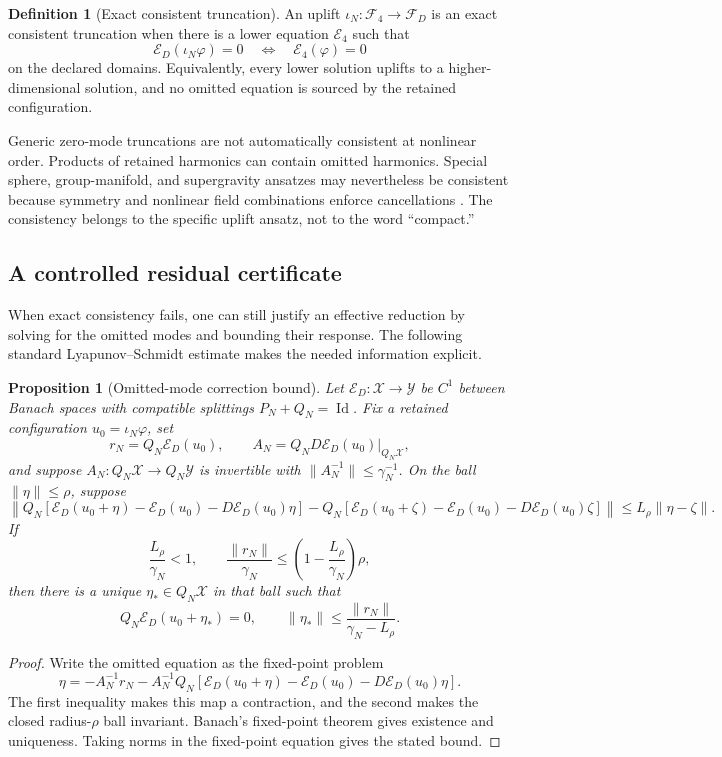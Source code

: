 \documentclass[11pt]{article}
\newtheorem{proposition}[theorem]{Proposition}
\theoremstyle{definition}
\newtheorem{definition}[theorem]{Definition}
\theoremstyle{remark}
\newcommand{\cE}{\mathcal E}
\newcommand{\cF}{\mathcal F}
\newcommand{\cX}{\mathcal X}
\newcommand{\cY}{\mathcal Y}
\newcommand{\Id}{\operatorname{Id}}
\begin{document}
\begin{definition}[Exact consistent truncation]
\label{def:consistent}
An uplift \(\iota_N:\cF_4\to\cF_D\) is an exact consistent truncation when
there is a lower equation \(\cE_4\) such that
\[
 \cE_D(\iota_N\varphi)=0
 \quad\Longleftrightarrow\quad
 \cE_4(\varphi)=0
\]
on the declared domains.  Equivalently, every lower solution uplifts to a
higher-dimensional solution, and no omitted equation is sourced by the
retained configuration.
\end{definition}

Generic zero-mode truncations are not automatically consistent at nonlinear
order.  Products of retained harmonics can contain omitted harmonics.
Special sphere, group-manifold, and supergravity ansatzes may nevertheless
be consistent because symmetry and nonlinear field combinations enforce
cancellations \cite{CveticLuPope2000}.  The consistency belongs to the
specific uplift ansatz, not to the word ``compact.''

\subsection{A controlled residual certificate}

When exact consistency fails, one can still justify an effective reduction
by solving for the omitted modes and bounding their response.  The following
standard Lyapunov--Schmidt estimate makes the needed information explicit.

\begin{proposition}[Omitted-mode correction bound]
\label{prop:residual}
Let \(\cE_D:\cX\to\cY\) be \(C^1\) between Banach spaces with compatible
splittings \(P_N+Q_N=\Id\).  Fix a retained configuration
\(u_0=\iota_N\varphi\), set
\[
 r_N=Q_N\cE_D(u_0),\qquad
 A_N=Q_ND\cE_D(u_0)\big|_{Q_N\cX},
\]
and suppose \(A_N:Q_N\cX\to Q_N\cY\) is invertible with
\(\|A_N^{-1}\|\le\gamma_N^{-1}\).  On the ball
\(\|\eta\|\le\rho\), suppose
\[
\left\|
Q_N\!\left[
\cE_D(u_0+\eta)-\cE_D(u_0)-D\cE_D(u_0)\eta
\right]
-
Q_N\!\left[
\cE_D(u_0+\zeta)-\cE_D(u_0)-D\cE_D(u_0)\zeta
\right]
\right\|
\le L_\rho\|\eta-\zeta\|.
\]
If
\[
 \frac{L_\rho}{\gamma_N}<1,
 \qquad
 \frac{\|r_N\|}{\gamma_N}
 \le
 \left(1-\frac{L_\rho}{\gamma_N}\right)\rho ,
\]
then there is a unique \(\eta_\ast\in Q_N\cX\) in that ball such that
\[
 Q_N\cE_D(u_0+\eta_\ast)=0,
\qquad
 \|\eta_\ast\|
 \le
 \frac{\|r_N\|}
      {\gamma_N-L_\rho}.
\]
\end{proposition}

\begin{proof}
Write the omitted equation as the fixed-point problem
\[
\eta=
-A_N^{-1}r_N
-A_N^{-1}Q_N\!
\left[
\cE_D(u_0+\eta)-\cE_D(u_0)-D\cE_D(u_0)\eta
\right].
\]
The first inequality makes this map a contraction, and the second makes the
closed radius-\(\rho\) ball invariant.  Banach's fixed-point theorem gives
existence and uniqueness.  Taking norms in the fixed-point equation gives
the stated bound.
\end{proof}
\end{document}
